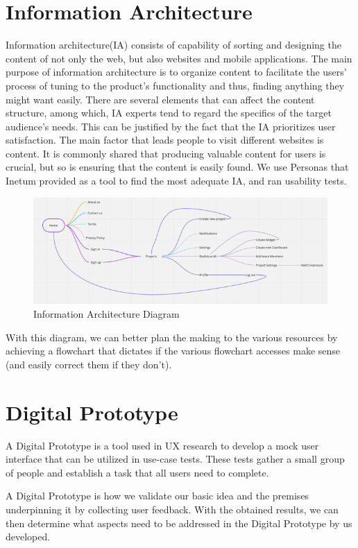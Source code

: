 \documentclass[a4paper,twoside,10pt]{report}
\begin{document}
\section{Information Architecture}
Information architecture(IA) consists of capability of sorting and designing the content of not only the web, but also websites and mobile applications. 
The main purpose of information architecture is to organize content to facilitate the users' process of tuning to the product's functionality and thus, finding anything they might want easily.
There are several elements that can affect the content structure, among which, IA experts tend to regard the specifics of the target audience's needs. This can be justified by the fact that the IA prioritizes user satisfaction.
The main factor that leads people to visit different websites is content. It is commonly shared that producing valuable content for users is crucial, but so is ensuring that the content is easily found. We use Personas that Inetum provided as a tool to find the most adequate IA, and ran usability tests.
 
\begin{figure}[h!]
\center
    \includegraphics[width=\textwidth]{information-architecture.png}
\caption{Information Architecture Diagram}
\end{figure}

With this diagram, we can better plan the making to the various resources by achieving a flowchart that dictates if the various flowchart accesses make sense (and easily correct them if they don't).

\newpage
\section{Digital Prototype}
A Digital Prototype is a tool used in UX research to develop a mock user interface that can be utilized in use-case tests. These tests gather a small group of people and establish a task that all users need to complete. 
 
A Digital Prototype is how we validate our basic idea and the premises underpinning it by collecting user feedback.
With the obtained results, we can then determine what aspects need to be addressed in the Digital Prototype by us developed.
 
\end{document}
